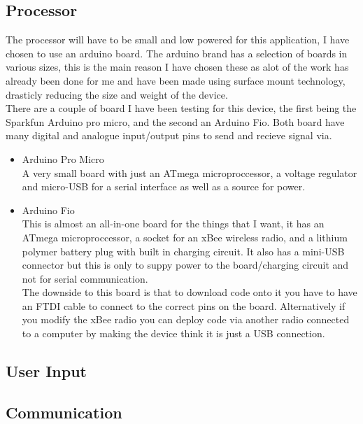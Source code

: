 \documentclass{article}
\begin{document}
\subsection{Processor}
The processor will have to be small and low powered for this application, I have chosen to use an arduino board.  The arduino brand has a selection of boards in various sizes, this is the main reason I have chosen these as alot of the work has already been done for me and have been made using surface mount technology, drasticly reducing the size and weight of the device.
\\There are a couple of board I have been testing for this device, the first being the Sparkfun Arduino pro micro, and the second an Arduino Fio.  Both board have many digital and analogue input/output pins to send and recieve signal via.
\begin{itemize}
\item Arduino Pro Micro
\\A very small board with just an ATmega microproccessor, a voltage regulator and micro-USB for a serial interface as well as a source for power.

\item Arduino Fio
\\This is almost an all-in-one board for the things that I want, it has an ATmega microproccessor, a socket for an xBee wireless radio, and a lithium polymer battery plug with built in charging circuit.  It also has a mini-USB connector but this is only to suppy power to the board/charging circuit and not for serial communication.
\\The downside to this board is that to download code onto it you have to have an FTDI cable to connect to the correct pins on the board.  Alternatively if you modify the xBee radio you can deploy code via another radio connected to a computer by making the device think it is just a USB connection.
\end{itemize}
\subsection{User Input}

\subsection{Communication}

\end{document}

